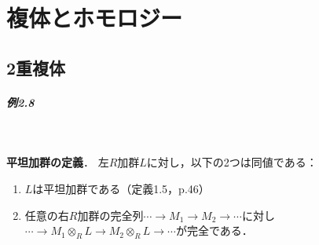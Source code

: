 \chapter{複体とホモロジー}
\setcounter{section}{1}
\section{2重複体}
\paragraph{例2.8}~
\begin{screen}
  \textbf{平坦加群の定義}．
  左$R$加群$L$に対し，以下の2つは同値である：
  \begin{enumerate}[label=(\roman*)]
    \item $L$は平坦加群である（定義1.5，p.46）
    \item 任意の右$R$加群の完全列$ \cdots \longrightarrow M_1 \longrightarrow M_2 \longrightarrow \cdots$に対し$ \cdots \longrightarrow M_1 \otimes_R L \longrightarrow M_2 \otimes_R L \longrightarrow \cdots$が完全である．
  \end{enumerate}
\end{screen}
